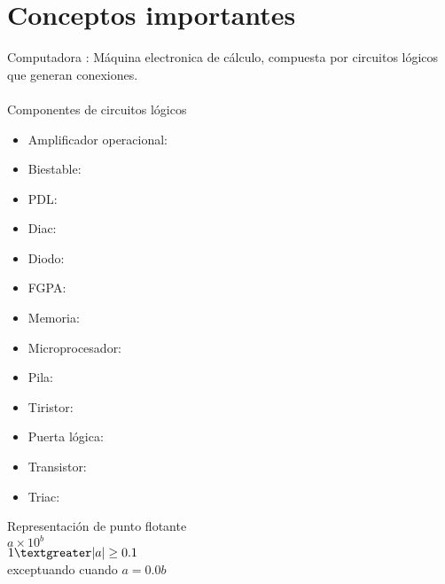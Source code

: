 \chapter{Conceptos importantes}

Computadora : M\'aquina electronica de c\'alculo, compuesta por circuitos l\'ogicos que generan conexiones.
\\ \\
Componentes de circuitos lógicos 

\begin{itemize}
\item Amplificador operacional:
\item Biestable:
\item PDL:
\item Diac:
\item Diodo:
\item FGPA: 
\item Memoria:
\item Microprocesador:
\item Pila:
\item Tiristor:
\item Puerta l\'ogica:
\item Transistor:
\item Triac: 
\end{itemize}



Representaci\'on de punto flotante \\
$a \times 10^b$\\
$1 \textgreater |a| \geq 0.1$\\
exceptuando cuando $a=0.0b$ \\

